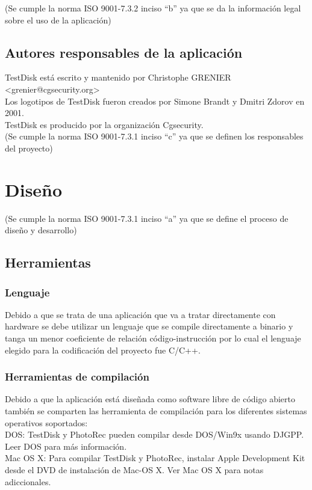 \documentclass[10pt,a4paper]{article}
\begin{document}
(Se cumple la norma ISO 9001-7.3.2 inciso “b” ya que se da la información legal sobre el uso de la aplicación)
\subsection{Autores responsables de la aplicación}
 TestDisk está escrito y mantenido por Christophe GRENIER <grenier@cgsecurity.org>\\
Los logotipos de TestDisk fueron creados por Simone Brandt y Dmitri Zdorov en 2001.\\
TestDisk es producido por la organización Cgsecurity.\\

(Se cumple la norma ISO 9001-7.3.1 inciso “c” ya que se definen los responsables del proyecto)
\section{Diseño}
(Se cumple la norma ISO 9001-7.3.1 inciso “a” ya que se define el proceso de diseño y desarrollo)
\subsection{Herramientas}
\subsubsection{Lenguaje}
Debido a que se trata de una aplicación que va a tratar directamente con hardware se debe utilizar un lenguaje que se compile directamente a binario y tanga un menor coeficiente de relación código-instrucción por lo cual el lenguaje elegido para la codificación del proyecto fue C/C++.\\
\subsubsection{Herramientas de compilación}
Debido a que la aplicación está diseñada como software libre de código abierto también se comparten las herramienta de compilación para los diferentes sistemas operativos soportados:
\\

DOS: 
TestDisk y PhotoRec pueden compilar desde DOS/Win9x usando DJGPP. Leer DOS para más información.\\

Mac OS X: 
Para compilar TestDisk y PhotoRec, instalar Apple Development Kit desde el DVD de instalación de Mac-OS X. Ver Mac OS X para notas adiccionales.\\
\end{document}
